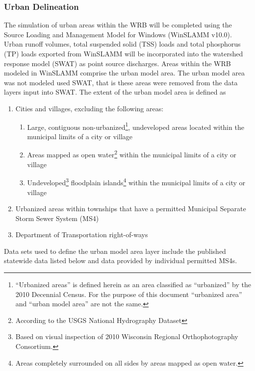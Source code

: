 \subsubsection{Urban Delineation}\label{sec:urban}
The simulation of urban areas within the WRB will be completed using the Source Loading and Management Model for Windows (WinSLAMM v10.0). Urban runoff volumes, total suspended solid (TSS) loads and total phosphorus (TP) loads exported from WinSLAMM will be incorporated into the watershed response model (SWAT) as point source discharges. Areas within the WRB modeled in WinSLAMM comprise the urban model area. The urban model area was not modeled used SWAT, that is these areas were removed from the data layers input into SWAT. The extent of the urban model area is defined as 

\begin{enumerate}
	\item Cities and villages, excluding the following areas:
	\begin{enumerate}
		\item Large, contiguous non-urbanized\footnote{``Urbanized areas'' is defined herein as an area classified as ``urbanized'' by the 2010 Decennial Census. For the purpose of this document ``urbanized area'' and ``urban model area'' are not the same.}, undeveloped areas located within the municipal limits of a city or village
		\item Areas mapped as open water\footnote{According to the USGS National Hydrography Dataset} within the municipal limits of a city or village
		\item Undeveloped\footnote{Based on visual inspection of 2010 Wisconsin Regional Orthophotography Consortium.} floodplain islands\footnote{Areas completely surrounded on all sides by areas mapped as open water.} within the municipal limits of a city or village
	\end{enumerate}

	\item Urbanized areas within townships that have a permitted Municipal Separate Storm Sewer System (MS4)
	\item Department of Transportation right-of-ways
\end{enumerate}

Data sets used to define the urban model area layer include the published statewide data listed below and data provided by individual permitted MS4s.

